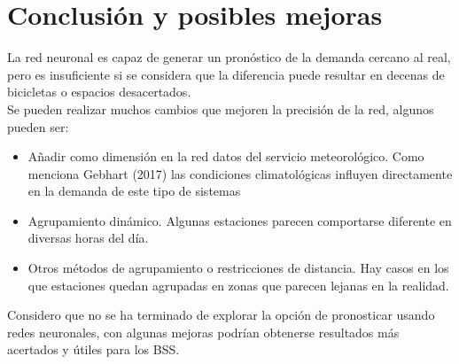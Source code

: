 \documentclass[12pt,spanish]{article}
\begin{document}
	\section{Conclusión y posibles mejoras}
	La red neuronal es capaz de generar un pronóstico de la demanda cercano al real, pero es insuficiente si se considera que la diferencia puede resultar en decenas de bicicletas o espacios desacertados.\\
	Se pueden realizar muchos cambios que mejoren la precisión de la red, algunos pueden ser:
	\begin{itemize}
		\item Añadir como dimensión en la red datos del servicio meteorológico. Como menciona Gebhart (2017) las condiciones climatológicas influyen directamente en la demanda de este tipo de sistemas
		\item Agrupamiento dinámico. Algunas estaciones parecen comportarse diferente en diversas horas del día.
		\item Otros métodos de agrupamiento o restricciones de distancia. Hay casos en los que estaciones quedan agrupadas en zonas que parecen lejanas en la realidad.
	\end{itemize}
	Considero que no se ha terminado de explorar la opción de pronosticar usando redes neuronales, con algunas mejoras podrían obtenerse resultados más acertados y útiles para los BSS.
	\newpage	
\end{document}
